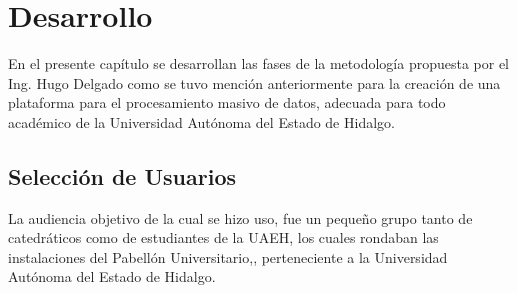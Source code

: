 \chapter{Desarrollo} \label{Capitulo: Desarrollo}
 
\begin{large}
\onehalfspacing %

En el presente capítulo se desarrollan las fases de la metodología propuesta por el Ing. Hugo Delgado como se tuvo mención anteriormente para la creación de una plataforma para el procesamiento masivo de datos, adecuada para todo académico de la Universidad Autónoma del Estado de Hidalgo.

\section*{Selección de Usuarios}

La audiencia objetivo de la cual se hizo uso, fue un pequeño grupo tanto de catedráticos como de estudiantes de la UAEH, los cuales rondaban las instalaciones del Pabellón Universitario,, perteneciente a la Universidad Autónoma del Estado de Hidalgo.

\end{large}
\newpage
